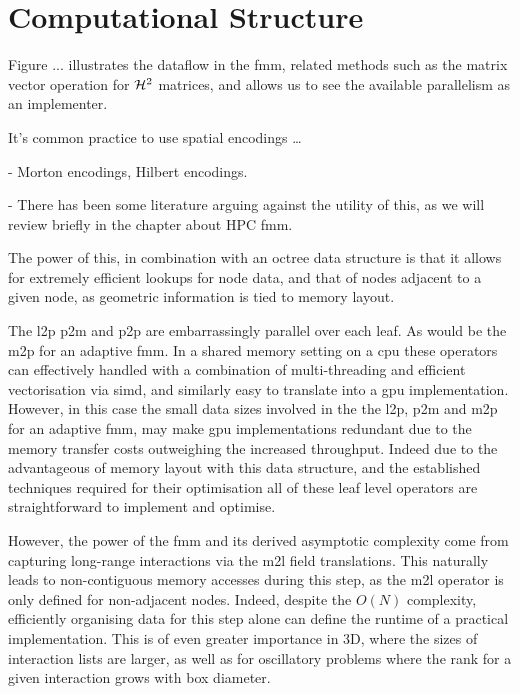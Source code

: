 \section{Computational Structure}\label{chpt:fmm:sec:computational_structure}

Figure ... illustrates the dataflow in the \acrshort{fmm}, related methods such as the matrix vector operation for $\mathcal{H}^2$ matrices, and allows us to see the available parallelism as an implementer.

It's common practice to use spatial encodings \dots

- Morton encodings, Hilbert encodings.

- There has been some literature arguing against the utility of this, as we will review briefly in the chapter about HPC fmm.

The power of this, in combination with an octree data structure is that it allows for extremely efficient lookups for node data, and that of nodes adjacent to a given node, as geometric information is tied to memory layout.

The \acrshort{l2p} \acrshort{p2m} and \acrshort{p2p} are embarrassingly parallel over each leaf. As would be the \acrshort{m2p} for an adaptive \acrshort{fmm}. In a shared memory setting on a \acrshort{cpu} these operators can effectively handled with a combination of multi-threading and efficient vectorisation via \acrshort{simd}, and similarly easy to translate into a \acrshort{gpu} implementation. However, in this case the small data sizes involved in the the \acrshort{l2p}, \acrshort{p2m} and \acrshort{m2p} for an adaptive \acrshort{fmm}, may make \acrshort{gpu} implementations redundant due to the memory transfer costs outweighing the increased throughput. Indeed due to the advantageous of memory layout with this data structure, and the established techniques required for their optimisation all of these leaf level operators are straightforward to implement and optimise.

However, the power of the \acrshort{fmm} and its derived asymptotic complexity come from capturing long-range interactions via the \acrshort{m2l} field translations. This naturally leads to non-contiguous memory accesses during this step, as the \acrshort{m2l} operator is only defined for non-adjacent nodes. Indeed, despite the $O(N)$ complexity, efficiently organising data for this step alone can define the runtime of a practical implementation. This is of even greater importance in 3D, where the sizes of interaction lists are larger, as well as for oscillatory problems where the rank for a given interaction grows with box diameter.

